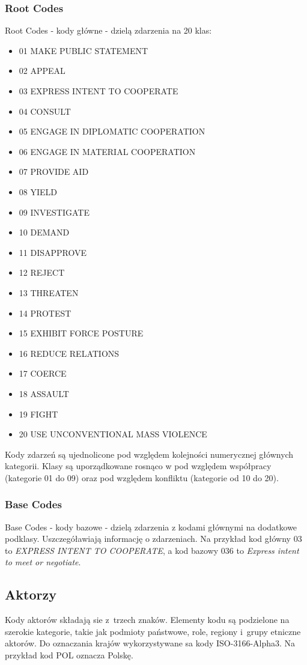 \documentclass[11pt]{report}
\begin{document}
    \subsubsection{Root Codes}
    Root Codes - kody główne - dzielą zdarzenia na 20 klas:
    \begin{itemize}
        \item 01 MAKE PUBLIC STATEMENT
        \item 02 APPEAL
        \item 03 EXPRESS INTENT TO COOPERATE
        \item 04 CONSULT
        \item 05 ENGAGE IN DIPLOMATIC COOPERATION
        \item 06 ENGAGE IN MATERIAL COOPERATION
        \item 07 PROVIDE AID
        \item 08 YIELD
        \item 09 INVESTIGATE
        \item 10 DEMAND
        \item 11 DISAPPROVE
        \item 12 REJECT
        \item 13 THREATEN
        \item 14 PROTEST
        \item 15 EXHIBIT FORCE POSTURE
        \item 16 REDUCE RELATIONS
        \item 17 COERCE
        \item 18 ASSAULT
        \item 19 FIGHT
        \item 20 USE UNCONVENTIONAL MASS VIOLENCE
    \end{itemize}
    Kody zdarzeń są ujednolicone pod względem kolejności numerycznej głównych kategorii.
    Klasy są uporządkowane rosnąco w pod względem współpracy (kategorie 01 do 09) oraz pod względem konfliktu
    (kategorie od 10 do 20).

    \subsubsection{Base Codes}
    Base Codes - kody bazowe - dzielą zdarzenia z kodami głównymi na dodatkowe podklasy.
    Uszczegóławiają informację o zdarzeniach.
    Na przykład kod główny 03 to \textit{EXPRESS INTENT TO COOPERATE},
    a kod bazowy 036 to \textit{Express intent to meet or negotiate}.

    \subsection{Aktorzy}
    Kody aktorów składają sie z~trzech znaków.
    Elementy kodu są podzielone na szerokie kategorie, takie jak podmioty państwowe, role, regiony i~grupy etniczne aktorów.
    Do oznaczania krajów wykorzystywane sa kody ISO-3166-Alpha3.
    Na przykład kod POL oznacza Polskę.
\end{document}
